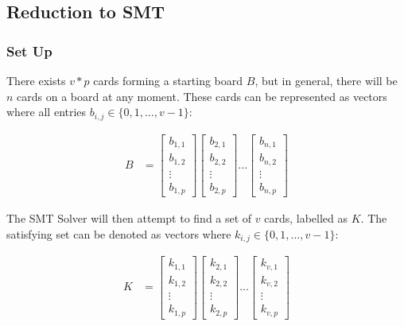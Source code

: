 \documentclass[pageno]{jpaper}
\begin{document}
\subsection{Reduction to SMT}

\subsubsection{Set Up}

There exists $v*p$ cards forming a starting board $B$, but in general, there will be $n$ cards on a board at any moment. These cards can be represented as vectors where all entries $b_{i,j} \in \{0,1, ... , v-1\}$:

\begin{align}
    B &= \begin{bmatrix}
           b_{1,1} \\
           b_{1,2} \\
           \vdots \\
           b_{1,p}
         \end{bmatrix}
         \begin{bmatrix}
           b_{2,1} \\
           b_{2,2} \\
           \vdots \\
           b_{2,p}
         \end{bmatrix} ... 
          \begin{bmatrix}
           b_{n,1} \\
           b_{n,2} \\
           \vdots \\
           b_{n,p}
         \end{bmatrix}
  \end{align}
  
The SMT Solver will then attempt to find a set of $v$ cards, labelled as $K$. The satisfying set can be denoted as vectors where $k_{i,j} \in \{0,1, ... , v-1\}$:

\begin{align}
    K &= \begin{bmatrix}
           k_{1,1} \\
           k_{1,2} \\
           \vdots \\
           k_{1,p}
         \end{bmatrix}
         \begin{bmatrix}
           k_{2,1} \\
           k_{2,2} \\
           \vdots \\
           k_{2,p}
         \end{bmatrix} ... 
          \begin{bmatrix}
           k_{v,1} \\
           k_{v,2} \\
           \vdots \\
           k_{v,p}
         \end{bmatrix}
  \end{align}
\end{document}

